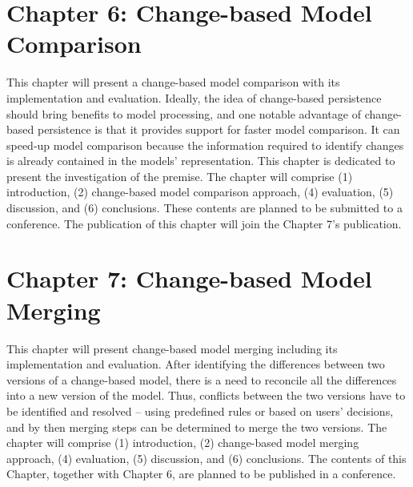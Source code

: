 \documentclass[12pt, a4paper]{report} \usepackage[titletoc]{appendix}
\begin{document}

\section{Chapter 6: Change-based Model Comparison}
\label{sec:chapter_6_change_based_model_comparison}
This chapter will present a change-based model comparison with its implementation and evaluation. Ideally, the idea of change-based persistence should bring benefits to model processing, and one notable advantage of change-based persistence is that it provides support for faster model comparison. It can speed-up model comparison because the information required to identify changes is already contained in the models' representation. This chapter is dedicated to present the investigation of the premise. The chapter will comprise (1) introduction, (2) change-based model comparison approach, (4) evaluation, (5) discussion, and (6) conclusions. These contents are planned to be submitted to a conference. The publication of this chapter will join the Chapter 7's publication. 


\section{Chapter 7: Change-based Model Merging}
\label{sec:chapter_7_change_based_model_Merging}
This chapter will present change-based model merging including its implementation and evaluation. After identifying the differences between two versions of a change-based model, there is a need to reconcile all the differences into a new version of the model. Thus, conflicts between the two versions have to be identified and resolved -- using predefined rules or based on users' decisions, and by then merging steps can be determined to merge the two versions. The chapter will comprise (1) introduction, (2) change-based model merging approach, (4) evaluation, (5) discussion, and (6) conclusions. The contents of this Chapter, together with Chapter 6, are planned to be published in a conference. 
\end{document}
